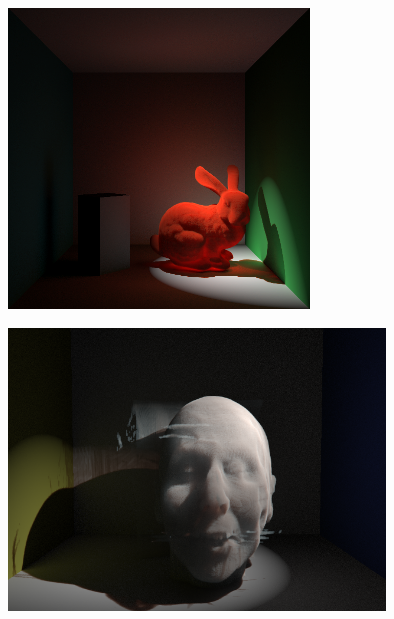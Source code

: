 \documentclass[10pt,compress,professionalfont]{beamer}
\begin{document}
\begin{frame}[c]{}

    {\centering
    \includegraphics[width=80mm]{../img/ketchup_good_corrected}\\
    }

\end{frame}




\begin{frame}[c]{}

    {\centering
    \includegraphics[width=100mm]{../img/face1}\\
    }

\end{frame}
\end{document}
